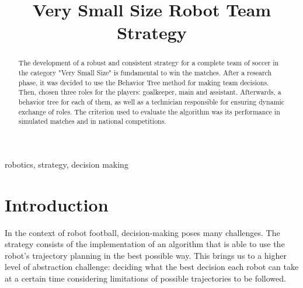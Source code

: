 \documentclass[conference]{IEEEtran}
\begin{document}
\title{Very Small Size Robot Team Strategy\\
}

\author{
\and
{}
\and
{}
}

\maketitle


\begin{abstract}
The development of a robust and consistent strategy for a complete team of soccer in the category "Very Small Size" is fundamental to win the matches. After a research phase, it was decided to use the Behavior Tree method for making team decisions. Then, chosen three roles for the players: goalkeeper, main and assistant. Afterwards, a behavior tree for each of them, as well as a technician responsible for ensuring dynamic exchange of roles. The criterion used to evaluate the algorithm was its performance in simulated matches and in national competitions.
\end{abstract}

\begin{IEEEkeywords}
robotics, strategy, decision making
\end{IEEEkeywords}

\section{Introduction}

In the context of robot football, decision-making poses many challenges. The strategy consists of the implementation of an algorithm that is able to use the robot's trajectory planning in the best possible way. This brings us to a higher level of abstraction challenge: deciding what the best decision each robot can take at a certain time considering limitations of possible trajectories to be followed.
\end{document}
